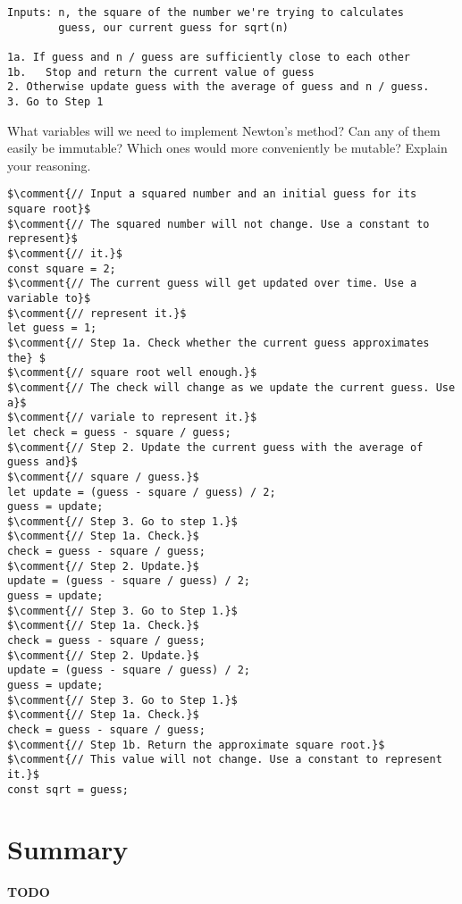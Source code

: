 \begin{lstlisting}[caption={Newton's method for calculating square roots, reprinted for your convenience.}]
Inputs: n, the square of the number we're trying to calculates
        guess, our current guess for sqrt(n)

1a. If guess and n / guess are sufficiently close to each other
1b.   Stop and return the current value of guess
2. Otherwise update guess with the average of guess and n / guess.
3. Go to Step 1
\end{lstlisting}

\begin{question}
  What variables will we need to implement Newton's method? Can any of them easily be immutable? Which ones would more conveniently be mutable? Explain your reasoning.
\end{question}

\begin{lstlisting}[escapeinside=$$]
$\comment{// Input a squared number and an initial guess for its square root}$
$\comment{// The squared number will not change. Use a constant to represent}$
$\comment{// it.}$
const square = 2;
$\comment{// The current guess will get updated over time. Use a variable to}$
$\comment{// represent it.}$
let guess = 1;
$\comment{// Step 1a. Check whether the current guess approximates the} $
$\comment{// square root well enough.}$
$\comment{// The check will change as we update the current guess. Use a}$
$\comment{// variale to represent it.}$
let check = guess - square / guess;
$\comment{// Step 2. Update the current guess with the average of guess and}$
$\comment{// square / guess.}$
let update = (guess - square / guess) / 2;
guess = update;
$\comment{// Step 3. Go to step 1.}$
$\comment{// Step 1a. Check.}$
check = guess - square / guess;
$\comment{// Step 2. Update.}$
update = (guess - square / guess) / 2;
guess = update;
$\comment{// Step 3. Go to Step 1.}$
$\comment{// Step 1a. Check.}$
check = guess - square / guess;
$\comment{// Step 2. Update.}$
update = (guess - square / guess) / 2;
guess = update;
$\comment{// Step 3. Go to Step 1.}$
$\comment{// Step 1a. Check.}$
check = guess - square / guess;
$\comment{// Step 1b. Return the approximate square root.}$
$\comment{// This value will not change. Use a constant to represent it.}$
const sqrt = guess;
\end{lstlisting}

\section{Summary}
\textbf{TODO}
